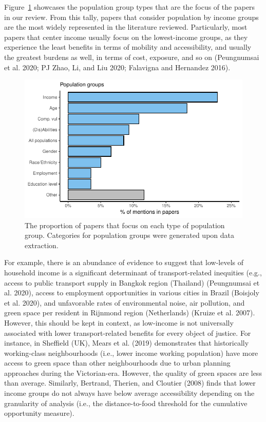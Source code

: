 \documentclass[12pt, oneside]{report}
\begin{document}
Figure~\ref{fig-fig4} showcases the population group types that are the
focus of the papers in our review. From this tally, papers that consider
population by income groups are the most widely represented in the
literature reviewed. Particularly, most papers that center income
usually focus on the lowest-income groups, as they experience the least
benefits in terms of mobility and accessibility, and usually the
greatest burdens as well, in terms of cost, exposure, and so on
(Peungnumsai et al. 2020; PJ Zhao, Li, and Liu 2020; Falavigna and
Hernandez 2016).

\begin{figure}

{\centering \includegraphics{just-transportation_files/figure-pdf/fig-fig4-1.pdf}

}

\caption{\label{fig-fig4}The proportion of papers that focus on each
type of population group. Categories for population groups were
generated upon data extraction.}

\end{figure}

For example, there is an abundance of evidence to suggest that
low-levels of household income is a significant determinant of
transport-related inequities (e.g., access to public transport supply in
Bangkok region (Thailand) (Peungnumsai et al. 2020), access to
employment opportunities in various cities in Brazil (Boisjoly et al.
2020), and unfavorable rates of environmental noise, air pollution, and
green space per resident in Rijnmond region (Netherlands) (Kruize et al.
2007). However, this should be kept in context, as low-income is not
universally associated with lower transport-related benefits for every
object of justice. For instance, in Sheffield (UK), Mears et al. (2019)
demonstrates that historically working-class neighbourhoods (i.e., lower
income working population) have more access to green space than other
neighbourhoods due to urban planning approaches during the
Victorian-era. However, the quality of green spaces are less than
average. Similarly, Bertrand, Therien, and Cloutier (2008) finds that
lower income groups do not always have below average accessibility
depending on the granularity of analysis (i.e., the distance-to-food
threshold for the cumulative opportunity measure).
\end{document}
